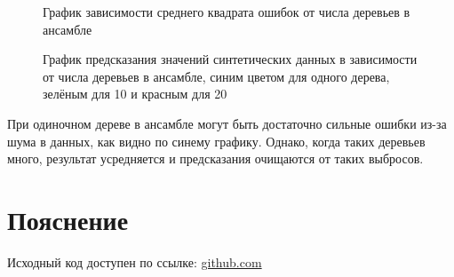 \documentclass{article} %
\begin{document}
\begin{figure}[H]
    \centering
    \noindent{}
    \caption{График зависимости среднего квадрата ошибок от числа деревьев в ансамбле}
\end{figure}
\bigskip

\begin{figure}[H]
    \centering
    \noindent{}
    \caption{График предсказания значений синтетических данных в зависимости от числа деревьев в ансамбле, синим цветом для одного дерева, зелёным для 10 и красным для 20}
\end{figure}
\bigskip

При одиночном дереве в ансамбле могут быть достаточно сильные ошибки из-за шума в данных, как видно по синему графику.
Однако, когда таких деревьев много, результат усредняется и
предсказания очищаются от таких выбросов.

\section{Пояснение}
Исходный код доступен по ссылке:
\href{https://github.com/SvichkarevAnatoly/Course-Python-Bioinformatics/tree/master/semester2/task7}
{github.com}
\end{document}

